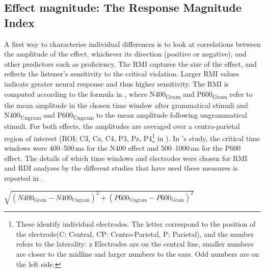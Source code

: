 \documentclass[output=paper,colorlinks,citecolor=brown,modfonts,nonflat]{../langscibook}
\begin{document}
\subsection{Effect magnitude: The Response Magnitude Index}

A first way to characterise individual differences is to look at correlations between the amplitude of the effect, whichever its direction (positive or negative), and other predictors such as proficiency. The RMI captures the size of the effect, and reflects the listener’s sensitivity to the critical violation. Larger RMI values indicate greater neural response and thus higher sensitivity. The RMI is computed according to the formula in , where N400\textsubscript{Gram} and P600\textsubscript{Gram} refer to the mean amplitude in the chosen time window after grammatical stimuli and N400\textsubscript{Ungram} and P600\textsubscript{Ungram} to the mean amplitude following ungrammatical stimuli. For both effects, the amplitudes are averaged over a centro-parietal region of interest (ROI; C3, Cz, C4, P3, Pz, P4\footnote{{These identify individual electrodes. The letter correspond to the position of the electrode(C: Central, CP: Centro-Parietal, P: Parietal), and the number refers to the laterality: z Electrodes are on the central line, smaller numbers are closer to the midline and larger numbers to the ears. Odd numbers are on the left side.}} in \citealt{TannerEtAl2014}). In \citet{TannerEtAl2014}’s study, the critical time windows were 400--500\,ms for the N400 effect and 500--1000\,ms for the P600 effect. The details of which time windows and electrodes were chosen for RMI and RDI analyses by the different studies that have used these measures is reported in . \label{bkm:Ref4399289}

\ea
$\sqrt{\left(N400_{{\text{Gram}}}-N400_{{\text{Ungram}}}\right)^2+\left(P600_{{\text{Ungram}}}-P600_{{\text{Gram}}}\right)^2}$
\z
\end{document}
